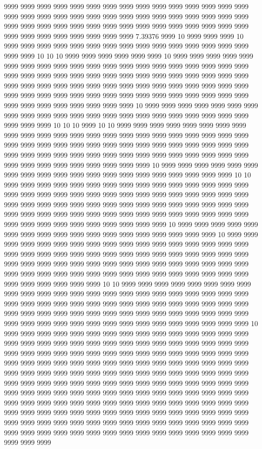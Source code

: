 9999 9999 9999 9999 9999 9999 9999 9999 9999 9999 9999 9999 9999 9999 9999 9999 9999 9999 9999 9999 9999 9999 9999 9999 9999 9999 9999 9999 9999 9999 9999 9999 9999 9999 9999 9999 9999 9999 9999 9999 9999 9999 9999 9999 9999 9999 9999 9999 9999 9999 9999 9999 9999 7.39376 9999 10 9999 9999 9999 10 9999 9999 9999 9999 9999 9999 9999 9999 9999 9999 9999 9999 9999 9999 9999 9999 9999 10 10 10 9999 9999 9999 9999 9999 9999 10 9999 9999 9999 9999 9999 9999 9999 9999 9999 9999 9999 9999 9999 9999 9999 9999 9999 9999 9999 9999 9999 9999 9999 9999 9999 9999 9999 9999 9999 9999 9999 9999 9999 9999 9999 9999 9999 9999 9999 9999 9999 9999 9999 9999 9999 9999 9999 9999 9999 9999 9999 9999 9999 9999 9999 9999 9999 9999 9999 9999 9999 9999 9999 9999 9999 9999 9999 9999 9999 9999 9999 9999 9999 10 9999 9999 9999 9999 9999 9999 9999 9999 9999 9999 9999 9999 9999 9999 9999 9999 9999 9999 9999 9999 9999 9999 9999 9999 9999 10 10 10 9999 10 10 9999 9999 9999 9999 9999 9999 9999 9999 9999 9999 9999 9999 9999 9999 9999 9999 9999 9999 9999 9999 9999 9999 9999 9999 9999 9999 9999 9999 9999 9999 9999 9999 9999 9999 9999 9999 9999 9999 9999 9999 9999 9999 9999 9999 9999 9999 9999 9999 9999 9999 9999 9999 9999 9999 9999 9999 9999 9999 9999 9999 9999 9999 10 9999 9999 9999 9999 9999 9999 9999 9999 9999 9999 9999 9999 9999 9999 9999 9999 9999 9999 9999 9999 10 10 9999 9999 9999 9999 9999 9999 9999 9999 9999 9999 9999 9999 9999 9999 9999 9999 9999 9999 9999 9999 9999 9999 9999 9999 9999 9999 9999 9999 9999 9999 9999 9999 9999 9999 9999 9999 9999 9999 9999 9999 9999 9999 9999 9999 9999 9999 9999 9999 9999 9999 9999 9999 9999 9999 9999 9999 9999 9999 9999 9999 9999 9999 9999 9999 9999 9999 9999 9999 9999 9999 10 9999 9999 9999 9999 9999 9999 9999 9999 9999 9999 9999 9999 9999 9999 9999 9999 9999 9999 10 9999 9999 9999 9999 9999 9999 9999 9999 9999 9999 9999 9999 9999 9999 9999 9999 9999 9999 9999 9999 9999 9999 9999 9999 9999 9999 9999 9999 9999 9999 9999 9999 9999 9999 9999 9999 9999 9999 9999 9999 9999 9999 9999 9999 9999 9999 9999 9999 9999 9999 9999 9999 9999 9999 9999 9999 9999 9999 9999 9999 9999 9999 9999 9999 9999 9999 9999 9999 10 10 9999 9999 9999 9999 9999 9999 9999 9999 9999 9999 9999 9999 9999 9999 9999 9999 9999 9999 9999 9999 9999 9999 9999 9999 9999 9999 9999 9999 9999 9999 9999 9999 9999 9999 9999 9999 9999 9999 9999 9999 9999 9999 9999 9999 9999 9999 9999 9999 9999 9999 9999 9999 9999 9999 9999 9999 9999 9999 9999 9999 9999 9999 9999 9999 9999 9999 9999 9999 10 9999 9999 9999 9999 9999 9999 9999 9999 9999 9999 9999 9999 9999 9999 9999 9999 9999 9999 9999 9999 9999 9999 9999 9999 9999 9999 9999 9999 9999 9999 9999 9999 9999 9999 9999 9999 9999 9999 9999 9999 9999 9999 9999 9999 9999 9999 9999 9999 9999 9999 9999 9999 9999 9999 9999 9999 9999 9999 9999 9999 9999 9999 9999 9999 9999 9999 9999 9999 9999 9999 9999 9999 9999 9999 9999 9999 9999 9999 9999 9999 9999 9999 9999 9999 9999 9999 9999 9999 9999 9999 9999 9999 9999 9999 9999 9999 9999 9999 9999 9999 9999 9999 9999 9999 9999 9999 9999 9999 9999 9999 9999 9999 9999 9999 9999 9999 9999 9999 9999 9999 9999 9999 9999 9999 9999 9999 9999 9999 9999 9999 9999 9999 9999 9999 9999 9999 9999 9999 9999 9999 9999 9999 9999 9999 9999 9999 9999 9999 9999 9999 9999 9999 9999 9999 9999 9999 9999 9999 9999 9999 9999 9999 9999 9999 9999 9999 9999 9999 